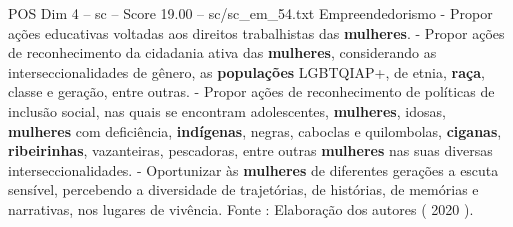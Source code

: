 \begin{textsample}{POS Dim 4 – sc – Score 19.00 – sc/sc\_em\_54.txt}
Empreendedorismo - Propor ações educativas voltadas aos direitos trabalhistas das \textbf{mulheres}. - Propor ações de reconhecimento da cidadania ativa das \textbf{mulheres}, considerando as interseccionalidades de gênero, as \textbf{populações} LGBTQIAP+, de etnia, \textbf{raça}, classe e geração, entre outras. - Propor ações de reconhecimento de políticas de inclusão social, nas quais se encontram adolescentes, \textbf{mulheres}, idosas, \textbf{mulheres} com deficiência, \textbf{indígenas}, negras, caboclas e quilombolas, \textbf{ciganas}, \textbf{ribeirinhas}, vazanteiras, pescadoras, entre outras \textbf{mulheres} nas suas diversas interseccionalidades. - Oportunizar às \textbf{mulheres} de diferentes gerações a escuta sensível, percebendo a diversidade de trajetórias, de histórias, de memórias e narrativas, nos lugares de vivência.
Fonte : Elaboração dos autores ( 2020 ).

\end{textsample}
